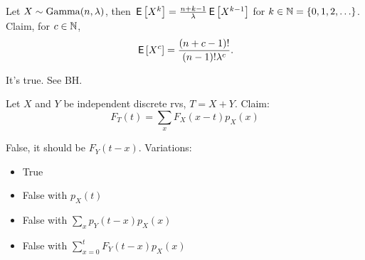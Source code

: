 \documentclass[tf-tutorial-all.tex]{subfiles}
\begin{document}
\begin{truefalse}
Let $X \sim \mathrm{Gamma}(n,\lambda)$, then $\,\mathsf{E}\left[X^{k}\right] = \frac{n+k-1}{\lambda} \,\mathsf{E}\left[X^{k-1}\right]$ for $k \in \mathbb{N} = \{0, 1, 2, \ldots\}$.
Claim, for $c\in \mathbb{N}$,
\begin{equation}
\,\mathsf{E}\left[X^{c}\right] =  \frac{(n+c-1)!}{(n-1)!\lambda^{c}}.
\end{equation}
    \begin{solution}
    It's true. See BH.
    \end{solution}
\end{truefalse}

\begin{truefalse}
  Let $X$ and $Y$ be independent discrete rvs, $T = X + Y$. Claim:
  $$F_T(t) = \sum_x F_X(x - t) p_X(x)$$
\begin{solution}
  False, it should be $F_Y(t - x)$.
  Variations:
  \begin{itemize}
  \item True
  \item False with $p_X(t)$
  \item False with $\sum_x p_Y(t -  x) p_X(x)$
  \item False with $\sum_{x=0}^t F_Y(t - x) p_X(x)$
  \end{itemize}
\end{solution}
\end{truefalse}
\end{document}
